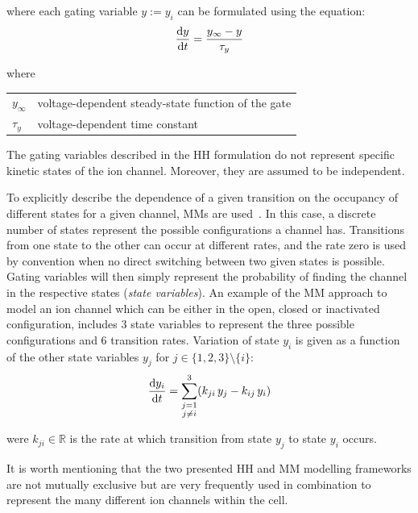 \noindent
where each gating variable $y:=y_i$ can be formulated using the equation:
%
\begin{equation}
    \dfrac{\mathrm{d}{y}}{\mathrm{d}{t}} = \frac{y_{\infty}-y}{\tau_y}
\end{equation}

\noindent
where

\vspace{0.2cm}
\begin{tabular}{ll}
$y_{\infty}$ & voltage-dependent steady-state function of the gate \\
$\tau_{y}$ & voltage-dependent time constant
\end{tabular}

\vspace{0.2cm}\noindent
The gating variables described in the HH formulation do not represent specific kinetic states of the ion channel. Moreover, they are assumed to be independent.

\vspace{0.2cm}
To explicitly describe the dependence of a given transition on the occupancy of different states for a given channel, MMs are used~\cite{Fink:2009}. In this case, a discrete number of states represent the possible configurations a channel has. Transitions from one state to the other can occur at different rates, and the rate zero is used by convention when no direct switching between two given states is possible. Gating variables will then simply represent the probability of finding the channel in the respective states (\textit{state variables}). An example of the MM approach to model an ion channel which can be either in the open, closed or inactivated configuration, includes $3$ state variables to represent the three possible configurations and $6$ transition rates. Variation of state $y_i$ is given as a function of the other state variables $y_j$ for $j\in\{1,2,3\}\setminus{\{i\}}$:
%
\begin{equation}
    \dfrac{\mathrm{d}{y_i}}{\mathrm{d}{t}} = \sum_{\substack{j=1 \\ j\neq i}}^{3} (k_{ji}\,y_j-k_{ij}\,y_i)
\end{equation}

\noindent
were $k_{ji}\in\mathbb{R}$ is the rate at which transition from state $y_j$ to state $y_i$ occurs.

\vspace{0.2cm}
It is worth mentioning that the two presented HH and MM modelling frameworks are not mutually exclusive but are very frequently used in combination to represent the many different ion channels within the cell.


